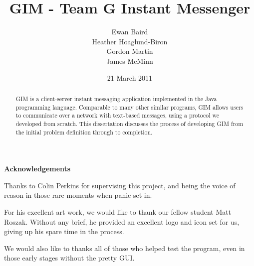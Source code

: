 \documentclass{l3proj}
\makeatletter
\newcommand\ackname{Acknowledgements}
\newenvironment{acknowledgements}{%
      \titlepage
      \null\vfil
      \@beginparpenalty\@lowpenalty
      \begin{center}%
        \bfseries \ackname
        \@endparpenalty\@M
      \end{center}}%
     {\par\vfil\null\endtitlepage}
\newenvironment{acknowledgements}{%
      \if@twocolumn
        \section*{\abstractname}%
      \else
        \small
        \begin{center}%
          {\bfseries \ackname\vspace{-.5em}\vspace{\z@}}%
        \end{center}%
        \quotation
      \fi}
      {\if@twocolumn\else\endquotation\fi}
\makeatother
\begin{document}
\title{GIM - Team G Instant Messenger}
\author{Ewan Baird \\
Heather Hoaglund-Biron \\
Gordon Martin \\
James McMinn}
\date{21 March 2011}
\maketitle

\begin{abstract}
GIM is a client-server instant messaging application implemented in the Java programming language. Comparable to many other similar programs, GIM allows users to communicate over a network with text-based messages, using a protocol we developed from scratch. This dissertation discusses the process of developing GIM from the initial problem definition through to completion.
\end{abstract}

\begin{acknowledgements}
Thanks to Colin Perkins for supervising this project, and being the voice of reason in those rare moments when panic set in.

For his excellent art work, we would like to thank our fellow student Matt Roszak. Without any brief, he provided an excellent logo and icon set for us, giving up his spare time in the process.

We would also like to thanks all of those who helped test the program, even in those early stages without the pretty GUI.
\end{acknowledgements}

\educationalconsent

\tableofcontents

















\end{document}
